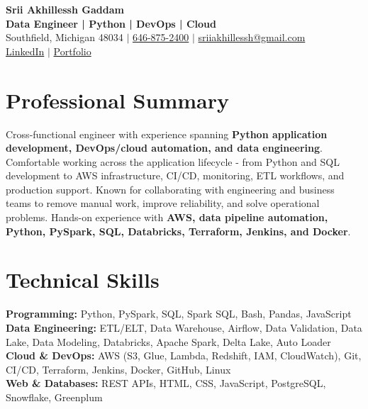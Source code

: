 \documentclass[letterpaper,10pt]{article}
\begin{document}
\fontsize{9.35pt}{10.45pt}\selectfont

\begin{center}
    {\LARGE \textbf{Srii Akhillessh Gaddam}} \\[-1pt]
    \textbf{Data Engineer | Python | DevOps | Cloud} \\[2pt]
    Southfield, Michigan 48034 $|$
    \href{tel:6468752400}{646-875-2400} $|$
    \href{mailto:sriiakhillessh@gmail.com}{sriiakhillessh@gmail.com} \\[1pt]
    \href{https://www.linkedin.com/in/srii-akhiilessh-gaddam-b48668191/}{LinkedIn} $|$
    \href{https://sriiakhillesshg.github.io/portfolio/}{Portfolio}
\end{center}
\vspace{-8pt}

\section{Professional Summary}
\small{Cross-functional engineer with experience spanning \textbf{Python application development, DevOps/cloud automation, and data engineering}. Comfortable working across the application lifecycle - from Python and SQL development to AWS infrastructure, CI/CD, monitoring, ETL workflows, and production support. Known for collaborating with engineering and business teams to remove manual work, improve reliability, and solve operational problems. Hands-on experience with \textbf{AWS, data pipeline automation, Python, PySpark, SQL, Databricks, Terraform, Jenkins, and Docker}.}

\section{Technical Skills}
\small{
\textbf{Programming:} Python, PySpark, SQL, Spark SQL, Bash, Pandas, JavaScript \\
\textbf{Data Engineering:} ETL/ELT, Data Warehouse, Airflow, Data Validation, Data Lake, Data Modeling, Databricks, Apache Spark, Delta Lake, Auto Loader \\
\textbf{Cloud \& DevOps:} AWS (S3, Glue, Lambda, Redshift, IAM, CloudWatch), Git, CI/CD, Terraform, Jenkins, Docker, GitHub, Linux \\
\textbf{Web \& Databases:} REST APIs, HTML, CSS, JavaScript, PostgreSQL, Snowflake, Greenplum
}
\end{document}
